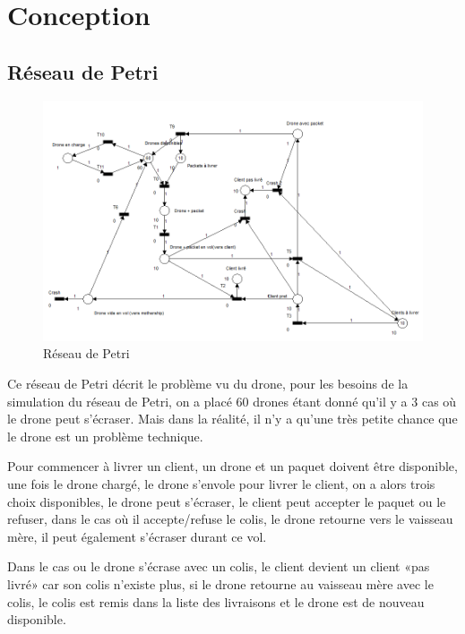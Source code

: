 \documentclass[article, backcover, french, nodocumentinfo]{upmethodology-document}
\begin{document}
	\upmdocumentsummary{}
	\upmdocumentauthors{}
	\upmdocumentinformedpeople{}
	\upmpublicationpage{}
	\thispagestyle{empty}
	\tableofcontents{}
	\newpage{}
	\section{Conception}
		\subsection{Réseau de Petri}
			\begin{figure}[H]
			  \centering
			  \includegraphics[width=\textwidth]{figures/petri_drones}
			  \caption{Réseau de Petri}
			  \label{fig:petrinet}
			\end{figure}
			Ce réseau de Petri décrit le problème vu du drone, pour les besoins de la
			simulation du réseau de Petri, on a placé 60 drones étant donné qu'il y a 3
			cas où le drone peut s'écraser. Mais dans la réalité, il n'y a qu'une très
			petite chance que le drone est un problème technique.

			Pour commencer à livrer un client, un drone et un paquet doivent être
			disponible, une fois le drone chargé, le drone s'envole pour livrer le
			client, on a alors trois choix disponibles, le drone peut s'écraser, le
			client peut accepter le paquet ou le refuser, dans le cas où il accepte/refuse le
			colis, le drone retourne vers le vaisseau mère, il peut également s'écraser
			durant ce vol.

			Dans le cas ou le drone s'écrase avec un colis, le client
			devient un client «pas livré» car son colis n'existe plus, si le drone
			retourne au vaisseau mère avec le colis, le colis est remis dans la liste
			des livraisons et le drone est de nouveau disponible.
\end{document}
